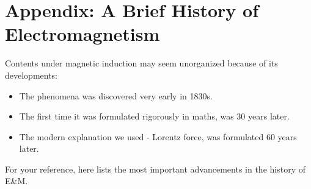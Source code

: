 \documentclass[class=article, crop=false, 12pt]{standalone}
\begin{document}
\theend

\newpage
\appendix
\section*{Appendix: A Brief History of Electromagnetism}

Contents under magnetic induction may seem unorganized because of its developments:
\begin{itemize}
    \item The phenomena was discovered very early in 1830s.
    \item The first time it was formulated rigorously in maths, was 30 years later.
    \item The modern explanation we used - Lorentz force, was formulated 60 years later.
\end{itemize}

For your reference, 
here lists the most important advancements in the history of E\&M.
\end{document}
